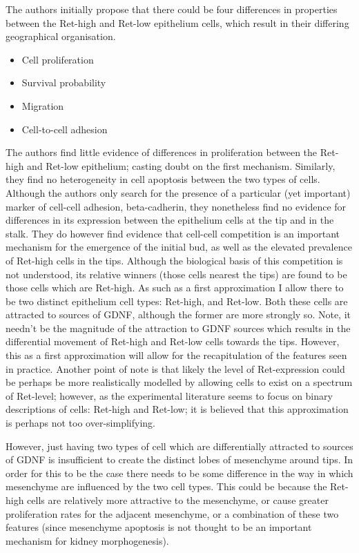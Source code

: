 \documentclass[pdftex,10pt,a4paper]{article}
\begin{document}
The authors initially propose that there could be four differences in properties between the Ret-high and Ret-low epithelium cells, which result in their differing geographical organisation. 

\begin{itemize}
\item Cell proliferation
\item Survival probability
\item Migration
\item Cell-to-cell adhesion
\end{itemize}

The authors find little evidence of differences in proliferation between the Ret-high and Ret-low epithelium; casting doubt on the first mechanism. Similarly, they find no heterogeneity in cell apoptosis between the two types of cells. Although the authors only search for the presence of a particular (yet important) marker of cell-cell adhesion, beta-cadherin, they nonetheless find no evidence for differences in its expression between the epithelium cells at the tip and in the stalk. They do however find evidence that cell-cell competition is an important mechanism for the emergence of the initial bud, as well as the elevated prevalence of Ret-high cells in the tips. Although the biological basis of this competition is not understood, its relative winners (those cells nearest the tips) are found to be those cells which are Ret-high. As such as a first approximation I allow there to be two distinct epithelium cell types: Ret-high, and Ret-low. Both these cells are attracted to sources of GDNF, although the former are more strongly so. Note, it needn't be the magnitude of the attraction to GDNF sources which results in the differential movement of Ret-high and Ret-low cells towards the tips. However, this as a first approximation will allow for the recapitulation of the features seen in practice. Another point of note is that likely the level of Ret-expression could be perhaps be more realistically modelled by allowing cells to exist on a spectrum of Ret-level; however, as the experimental literature seems to focus on binary descriptions of cells: Ret-high and Ret-low; it is believed that this approximation is perhaps not too over-simplifying. 

However, just having two types of cell which are differentially attracted to sources of GDNF is insufficient to create the distinct lobes of mesenchyme around tips. In order for this to be the case there needs to be some difference in the way in which mesenchyme are influenced by the two cell types. This could be because the Ret-high cells are relatively more attractive to the mesenchyme, or cause greater proliferation rates for the adjacent mesenchyme, or a combination of these two features (since mesenchyme apoptosis is not thought to be an important mechanism for kidney morphogenesis).
\end{document}
